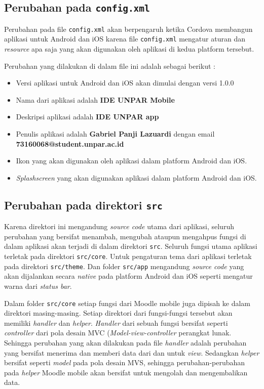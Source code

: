 \subsection{Perubahan pada \texttt{config.xml}}
Perubahan pada file \texttt{config.xml} akan berpengaruh ketika Cordova membangun aplikasi untuk Android dan iOS karena file \texttt{config.xml} mengatur aturan dan \textit{resource} apa saja yang akan digunakan oleh aplikasi di kedua platform tersebut. 

Perubahan yang dilakukan di dalam file ini adalah sebagai berikut : 

\begin{itemize}
\item Versi aplikasi untuk Android dan iOS akan dimulai dengan versi 1.0.0
\item Nama dari aplikasi adalah \textbf{IDE UNPAR Mobile}
\item Deskripsi aplikasi adalah \textbf{IDE UNPAR app}
\item Penulis aplikasi adalah \textbf{Gabriel Panji Lazuardi} dengan email \textbf{73160068@student.unpar.ac.id}
\item Ikon yang akan digunakan oleh aplikasi dalam platform Android dan iOS.
\item \textit{Splashscreen} yang akan digunakan aplikasi dalam platform Android dan iOS.
\end{itemize}  

\subsection{Perubahan pada direktori \texttt{src}}

Karena direktori ini mengandung \textit{source code} utama dari aplikasi, seluruh perubahan yang bersifat menambah, mengubah ataupun mengahpus fungsi di dalam aplikasi akan terjadi di dalam direktori \texttt{src}. Seluruh fungsi utama aplikasi terletak pada direktori \texttt{src/core}. Untuk pengaturan tema dari aplikasi terletak pada direktori \texttt{src/theme}. Dan folder \texttt{src/app} mengandung \textit{source code} yang akan dijalankan secara \textit{native} pada platform Android dan iOS seperti mengatur warna dari \textit{status bar}.	

Dalam folder \texttt{src/core} setiap fungsi dari Moodle mobile juga dipisah ke dalam direktori masing-masing. Setiap direktori dari fungsi-fungsi tersebut akan memiliki \textit{handler} dan \textit{helper}. \textit{Handler} dari sebuah fungsi bersifat seperti \textit{controller} dari pola desain MVC (\textit{Model-view-controller} perangkat lunak. Sehingga perubahan yang akan dilakukan pada file \textit{handler} adalah perubahan yang bersifat menerima dan memberi data dari dan untuk \textit{view}. Sedangkan \textit{helper} bersifat seperti \textit{model} pada pola desain MVS, sehingga perubahan-perubahan pada \textit{helper} Moodle mobile akan bersifat untuk mengolah dan mengembalikan data.

